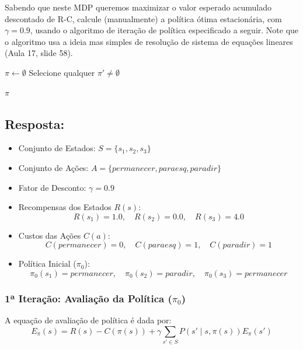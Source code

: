\documentclass[a4paper,12pt]{article}
\begin{document}
Sabendo que neste MDP queremos maximizar o valor esperado acumulado descontado de R-C,
calcule (manualmente) a política ótima estacionária, com $\gamma = 0.9$, usando o algoritmo de iteração
de política especificado a seguir. Note que o algoritmo usa a ideia mas simples de resolução de
sistema de equações lineares (Aula 17, slide 58).

\begin{algorithm}[H]
	\SetAlgoLined
	\caption{Iteração-de-Política($S, A, P, R, C, \gamma$)}
	
	$\pi \leftarrow \emptyset$ \;
	Selecione qualquer $\pi' \neq \emptyset$ 
	
	\Return $\pi$ \;
\end{algorithm}

\subsection*{Resposta:}

\bigskip


\begin{itemize}
	\item Conjunto de Estados: $S = \{s_1, s_2, s_3\}$
	\item Conjunto de Ações: $A = \{\textit{permanecer}, \textit{paraesq}, \textit{paradir}\}$
	\item Fator de Desconto: $\gamma = 0.9$
	\item Recompensas dos Estados $R(s)$:
	\[
	R(s_1) = 1.0, \quad R(s_2) = 0.0, \quad R(s_3) = 4.0
	\]
	\item Custos das Ações $C(a)$:
	\[
	C(\textit{permanecer}) = 0, \quad C(\textit{paraesq}) = 1, \quad C(\textit{paradir}) = 1
	\]
	\item Política Inicial ($\pi_0$):
	\[
	\pi_0(s_1) = \textit{permanecer}, \quad \pi_0(s_2) = \textit{paradir}, \quad \pi_0(s_3) = \textit{permanecer}
	\]
\end{itemize}


\subsubsection*{1ª Iteração: Avaliação da Política ($\pi_0$)}
A equação de avaliação de política é dada por:
\[
E_\pi(s) = R(s) - C(\pi(s)) + \gamma \sum_{s' \in S} P(s' \mid s, \pi(s)) E_\pi(s')
\]
\end{document}
